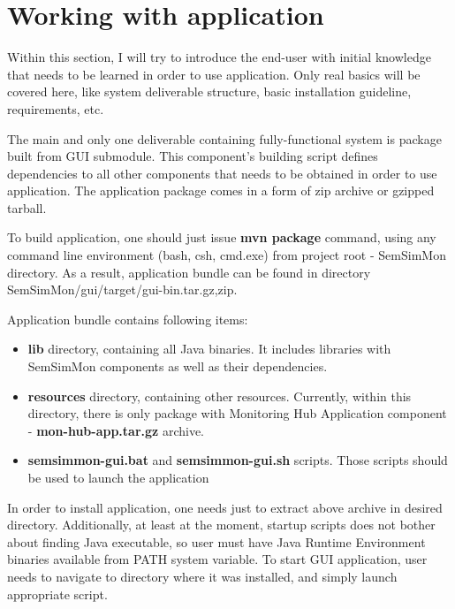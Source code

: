 %


\section{Working with application}
\label{sec:ch7_working_with}

Within this section, I will try to introduce the end-user with initial knowledge that needs to be learned in order to use application. Only real basics will be covered here, like system deliverable structure, basic installation guideline, requirements, etc.

The main and only one deliverable containing fully-functional system is package built from GUI submodule. This component\rq{}s building script defines dependencies to all other components that needs to be obtained in order to use application. The application package comes in a form of zip archive or gzipped tarball. 

To build application, one should just issue {\bf mvn package} command, using any command line environment (bash, csh, cmd.exe) from project root - SemSimMon directory. As a result, application bundle can be found in directory SemSimMon/gui/target/gui-bin.{tar.gz,zip}.

Application bundle contains following items:
\begin{itemize}
  \item {\bf lib} directory, containing all Java binaries. It includes libraries with SemSimMon components as well as their dependencies.
  \item {\bf resources} directory, containing other resources. Currently, within this directory, there is only package with Monitoring Hub Application component - {\bf mon-hub-app.tar.gz} archive.
  \item {\bf semsimmon-gui.bat} and {\bf semsimmon-gui.sh} scripts. Those scripts should be used to launch the application	
\end{itemize}  

In order to install application, one needs just to extract above archive in desired directory. Additionally, at least at the moment, startup scripts does not bother about finding Java executable, so user must have Java Runtime Environment binaries available from PATH system variable. To start GUI application, user needs to navigate to directory where it was installed, and simply launch appropriate script.

